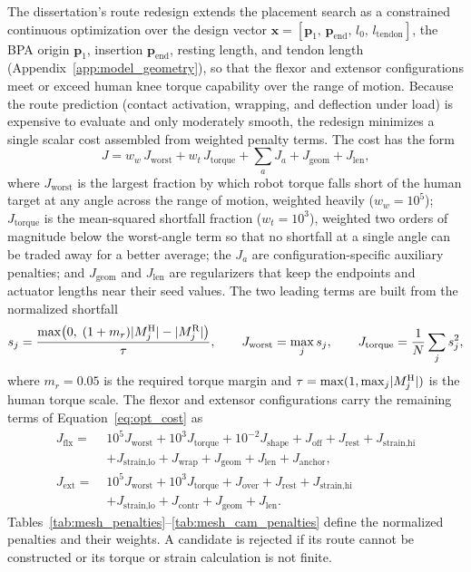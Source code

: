 The dissertation's route redesign extends the placement search as a constrained continuous optimization over the design vector $\mathbf{x} = [\mathbf{p}_{1},\, \mathbf{p}_{\mathrm{end}},\, l_{0},\, l_{\mathrm{tendon}}]$, the BPA origin $\mathbf{p}_{1}$, insertion $\mathbf{p}_{\mathrm{end}}$, resting length, and tendon length (Appendix~\ref{app:model_geometry}), so that the flexor and extensor configurations meet or exceed human knee torque capability over the range of motion. Because the route prediction (contact activation, wrapping, and deflection under load) is expensive to evaluate and only moderately smooth, the redesign minimizes a single scalar cost assembled from weighted penalty terms. The cost has the form
\begin{equation}
    J = w_{w}\,J_{\text{worst}} + w_{t}\,J_{\text{torque}} + \textstyle\sum_{a} J_{a} + J_{\text{geom}} + J_{\text{len}},
    \label{eq:opt_cost}
\end{equation}
where $J_{\text{worst}}$ is the largest fraction by which robot torque falls short of the human target at any angle across the range of motion, weighted heavily ($w_{w} = 10^{5}$); $J_{\text{torque}}$ is the mean-squared shortfall fraction ($w_{t} = 10^{3}$), weighted two orders of magnitude below the worst-angle term so that no shortfall at a single angle can be traded away for a better average; the $J_{a}$ are configuration-specific auxiliary penalties; and $J_{\text{geom}}$ and $J_{\text{len}}$ are regularizers that keep the endpoints and actuator lengths near their seed values. The two leading terms are built from the normalized shortfall
\begin{equation}
s_{j} = \frac{\max\!\left(0,\; (1+m_{r})\lvert M^{\mathrm{H}}_{j}\rvert - \lvert M^{\mathrm{R}}_{j}\rvert\right)}{\tau},
\qquad
J_{\text{worst}} = \max_{j} s_{j},
\qquad
J_{\text{torque}} = \frac{1}{N}\sum_{j} s_{j}^{2},
\label{eq:mesh_penalty_def}
\end{equation}
where $m_{r} = 0.05$ is the required torque margin and $\tau = \max(1, \max_{j}\lvert M^{\mathrm{H}}_{j}\rvert)$ is the human torque scale. The flexor and extensor configurations carry the remaining terms of Equation~\eqref{eq:opt_cost} as
\begin{align}
J_{\mathrm{flx}} =\;& 10^{5}J_{\text{worst}} + 10^{3}J_{\text{torque}} + 10^{-2}J_{\text{shape}} + J_{\text{off}} + J_{\text{rest}} + J_{\text{strain,hi}} \nonumber\\
& + J_{\text{strain,lo}} + J_{\text{wrap}} + J_{\text{geom}} + J_{\text{len}} + J_{\text{anchor}},
\label{eq:opt_cost_flx}\\[4pt]
J_{\mathrm{ext}} =\;& 10^{5}J_{\text{worst}} + 10^{3}J_{\text{torque}} + J_{\text{over}} + J_{\text{rest}} + J_{\text{strain,hi}} \nonumber\\
& + J_{\text{strain,lo}} + J_{\text{contr}} + J_{\text{geom}} + J_{\text{len}}.
\label{eq:opt_cost_ext}
\end{align}
Tables~\ref{tab:mesh_penalties}--\ref{tab:mesh_cam_penalties} define the normalized penalties and their weights. A candidate is rejected if its route cannot be constructed or its torque or strain calculation is not finite.

